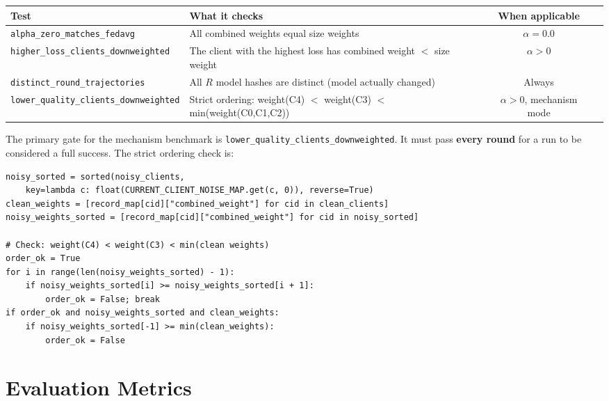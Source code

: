 \documentclass[12pt,a4paper]{article}
\begin{document}
\begin{center}
\renewcommand{\arraystretch}{1.5}
\begin{tabularx}{\textwidth}{lXcc}
\toprule
\textbf{Test} & \textbf{What it checks} & \textbf{When applicable} \\
\midrule
\texttt{alpha\_zero\_matches\_fedavg} & All combined weights equal size weights & $\alpha=0.0$ \\
\texttt{higher\_loss\_clients\_downweighted} & The client with the highest loss has combined weight $<$ size weight & $\alpha>0$ \\
\texttt{distinct\_round\_trajectories} & All $R$ model hashes are distinct (model actually changed) & Always \\
\texttt{lower\_quality\_clients\_downweighted} & Strict ordering: weight(C4) $<$ weight(C3) $<$ min(weight(C0,C1,C2)) & $\alpha>0$, mechanism mode \\
\bottomrule
\end{tabularx}
\end{center}

The primary gate for the mechanism benchmark is \texttt{lower\_quality\_clients\_downweighted}. It must pass \textbf{every round} for a run to be considered a full success. The strict ordering check is:

\begin{lstlisting}[caption={Strict ordering check in evaluate\_single\_run\_acceptance()}]
noisy_sorted = sorted(noisy_clients,
    key=lambda c: float(CURRENT_CLIENT_NOISE_MAP.get(c, 0)), reverse=True)
clean_weights = [record_map[cid]["combined_weight"] for cid in clean_clients]
noisy_weights_sorted = [record_map[cid]["combined_weight"] for cid in noisy_sorted]

# Check: weight(C4) < weight(C3) < min(clean weights)
order_ok = True
for i in range(len(noisy_weights_sorted) - 1):
    if noisy_weights_sorted[i] >= noisy_weights_sorted[i + 1]:
        order_ok = False; break
if order_ok and noisy_weights_sorted and clean_weights:
    if noisy_weights_sorted[-1] >= min(clean_weights):
        order_ok = False
\end{lstlisting}

\section{Evaluation Metrics}
\end{document}
